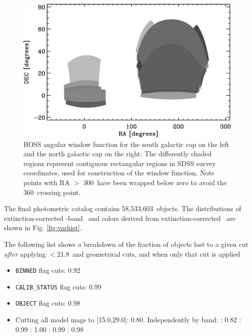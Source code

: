 \documentclass[12pt,preprint]{aastex}
\newcommand{\rmax}{21.8}
\newcommand{\nphoto}{58,533,603}
\begin{document}
\begin{figure}[t] \centering
 \centering 
 \includegraphics[scale=0.6]{figures/boss-poly-coverage.eps}

 \caption{BOSS angular window function for the south galactic cap on the left
 and the north galactic cap on the right.  The differently shaded regions
 represent contiguous rectangular regions in SDSS survey coordinates, used for
 construction of the window function.  Note points with RA $>$ 300\arcdeg\ have
 been wrapped below zero to avoid the 360\arcdeg\ crossing point.}
 \label{fig:footprint}

\end{figure}

The final photometric catalog contains \nphoto\ objects.  The distributions of
extinction-corrected \rmag-band \cmodelmag\ and colors derived from
extinction-corrected \modelmag\ are shown in Fig. \ref{fig:varhist}.

The following list shows a breakdown of the fraction of objects lost
to a given cut {\it after} applying \rmag$ < $\rmax\ and geometrical
cuts, and when only that cut is applied

\begin{itemize}
    \item \texttt{BINNED} flag cuts: 0.92
    \item \texttt{CALIB\_STATUS} flag cuts: 0.99
    \item \texttt{OBJECT} flag cuts: 0.98
    \item Cutting all model mags to [15.0,29.0]: 0.80. Independently by band:
    \umag: 0.82 \gmag: 0.99 \rmag: 1.00 \imag: 0.99 \zmag: 0.98

\end{itemize}
\end{document}
